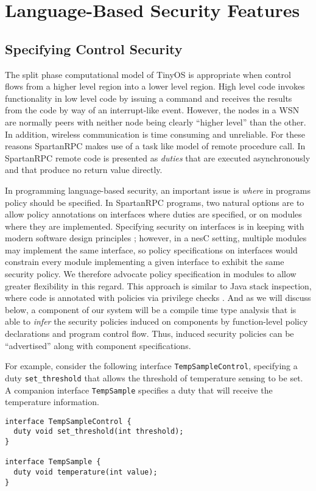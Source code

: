 \section{Language-Based Security Features} 

\subsection{Specifying Control Security} 

The split phase computational model of TinyOS is appropriate when control flows from a higher
level region into a lower level region. High level code invokes functionality in low level code
by issuing a command and receives the results from the code by way of an interrupt-like event.
However, the nodes in a WSN are normally peers with neither node being clearly ``higher level''
than the other. In addition, wireless communication is time consuming and unreliable. For these
reasons SpartanRPC makes use of a task like model of remote procedure call. In SpartanRPC remote
code is presented as \emph{duties} that are executed asynchronously and that produce no return
value directly.

In programming language-based security, an important issue is \emph{where} in programs policy
should be specified. In SpartanRPC programs, two natural options are to allow policy annotations
on interfaces where duties are specified, or on modules where they are implemented. Specifying
security on interfaces is in keeping with modern software design principles \cite{503253};
however, in a nesC setting, multiple modules may implement the same interface, so policy
specifications on interfaces would constrain every module implementing a given interface to
exhibit the same security policy. We therefore advocate policy specification in modules to allow
greater flexibility in this regard. This approach is similar to Java stack inspection, where
code is annotated with policies via privilege checks \cite{pottier-skalka-smith-toplas05}. And
as we will discuss below, a component of our system will be a compile time type analysis that is
able to \emph{infer} the security policies induced on components by function-level policy
declarations and program control flow. Thus, induced security policies can be ``advertised''
along with component specifications.

For example, consider the following interface \texttt{TempSampleControl}, specifying a duty
\texttt{set\_threshold} that allows the threshold of temperature sensing to be set. A companion
interface \texttt{TempSample} specifies a duty that will receive the temperature information.
\begin{verbatim}
interface TempSampleControl {
  duty void set_threshold(int threshold);
}

interface TempSample {
  duty void temperature(int value);
}
\end{verbatim}

